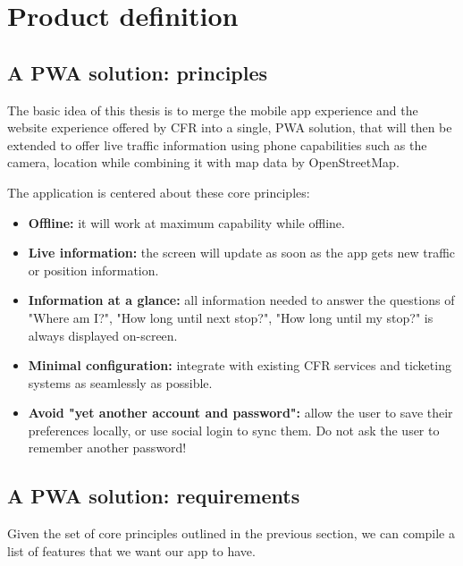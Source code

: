 \chapter{Product definition}

\section{A PWA solution: principles}

The basic idea of this thesis is to merge the mobile app experience and the website experience offered by CFR into a single, PWA solution, that will then be extended to offer live traffic information using phone capabilities such as the camera, location while combining it with map data by OpenStreetMap.

The application is centered about these core principles:

\begin{itemize}
    \item \textbf{Offline:} it will work at maximum capability while offline.
    \item \textbf{Live information:} the screen will update as soon as the app gets new traffic or position information.
    \item \textbf{Information at a glance:} all information needed to answer the questions of "Where am I?", "How long until next stop?", "How long until my stop?" is always displayed on-screen.
    \item \textbf{Minimal configuration:} integrate with existing CFR services and ticketing systems as seamlessly as possible.
    \item \textbf{Avoid "yet another account and password":} allow the user to save their preferences locally, or use social login to sync them. Do not ask the user to remember another password!
\end{itemize}

\section{A PWA solution: requirements}
\label{sec:Requirements}

Given the set of core principles outlined in the previous section, we can compile a list of features that we want our app to have.

